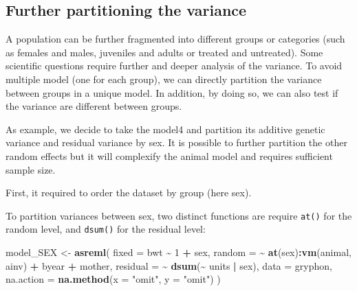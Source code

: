 \documentclass[
  12pt,
]{book}
\newenvironment{Shaded}{\begin{snugshade}}{\end{snugshade}}
\newcommand{\DataTypeTok}[1]{\textcolor[rgb]{0.13,0.29,0.53}{#1}}
\newcommand{\DecValTok}[1]{\textcolor[rgb]{0.00,0.00,0.81}{#1}}
\newcommand{\KeywordTok}[1]{\textcolor[rgb]{0.13,0.29,0.53}{\textbf{#1}}}
\newcommand{\NormalTok}[1]{#1}
\newcommand{\OperatorTok}[1]{\textcolor[rgb]{0.81,0.36,0.00}{\textbf{#1}}}
\newcommand{\StringTok}[1]{\textcolor[rgb]{0.31,0.60,0.02}{#1}}
\begin{document}
\hypertarget{further-partitioning-the-variance}{%
\subsection{Further partitioning the variance}\label{further-partitioning-the-variance}}

A population can be further fragmented into different groups or categories (such as females and males, juveniles and adults or treated and untreated). Some scientific questions require further and deeper analysis of the variance.
To avoid multiple model (one for each group), we can directly partition the variance between groups in a unique model. In addition, by doing so, we can also test if the variance are different between groups.

As example, we decide to take the model4 and partition its additive genetic variance and residual variance by sex. It is possible to further partition the other random effects but it will complexify the animal model and requires sufficient sample size.

First, it required to order the dataset by group (here sex).

\begin{Shaded}
\end{Shaded}

To partition variances between sex, two distinct functions are require \texttt{at()} for the random level, and \texttt{dsum()} for the residual level:

\begin{Shaded}
\begin{Highlighting}[]
\NormalTok{model\_SEX \textless{}{-}}\StringTok{ }\KeywordTok{asreml}\NormalTok{(}
  \DataTypeTok{fixed =}\NormalTok{ bwt }\OperatorTok{\textasciitilde{}}\StringTok{ }\DecValTok{1} \OperatorTok{+}\StringTok{ }\NormalTok{sex,}
  \DataTypeTok{random =} \OperatorTok{\textasciitilde{}}\StringTok{ }\KeywordTok{at}\NormalTok{(sex)}\OperatorTok{:}\KeywordTok{vm}\NormalTok{(animal, ainv) }\OperatorTok{+}\StringTok{ }\NormalTok{byear }\OperatorTok{+}\StringTok{ }\NormalTok{mother,}
  \DataTypeTok{residual =} \OperatorTok{\textasciitilde{}}\StringTok{ }\KeywordTok{dsum}\NormalTok{(}\OperatorTok{\textasciitilde{}}\StringTok{ }\NormalTok{units }\OperatorTok{|}\StringTok{ }\NormalTok{sex),}
  \DataTypeTok{data =}\NormalTok{ gryphon,}
  \DataTypeTok{na.action =} \KeywordTok{na.method}\NormalTok{(}\DataTypeTok{x =} \StringTok{"omit"}\NormalTok{, }\DataTypeTok{y =} \StringTok{"omit"}\NormalTok{)}
\NormalTok{)}
\end{Highlighting}
\end{Shaded}
\end{document}
